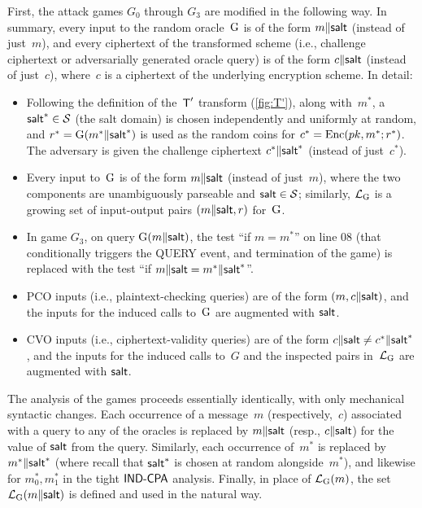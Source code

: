 \documentclass{iacrcc}
\begin{document}
First, the attack games $G_{0}$ through $G_{3}$ are modified in the following way.
In summary, every input to the random oracle~$\textrm{\upshape\mdseries G}$ is of the form $m \| {\mathsf{salt}}$ (instead of just~$m$), and every ciphertext of the transformed scheme (i.e., challenge ciphertext or adversarially generated oracle query) is of the form $c \| {\mathsf{salt}}$ (instead of just~$c$), where~$c$ is a ciphertext of the underlying encryption scheme.
In detail:
\begin{itemize}
\item Following the definition of the~$\textsf{\upshape\mdseries T}'$ transform (\autoref{fig:T'}), along with~$m^{*}$, a ${\mathsf{salt}}^{*} \in \mathcal{S}$ (the salt domain) is chosen independently and uniformly at random, and $r^{*} = \textrm{\upshape\mdseries G}(m^{*} \| {\mathsf{salt}}^{*})$ is used as the random coins for $c^{*} = \textrm{\upshape\mdseries Enc}(pk, m^{*}; r^{*})$.
  The adversary is given the challenge ciphertext $c^{*} \| {\mathsf{salt}}^{*}$ (instead of just~$c^{*}$).

\item Every input to~$\textrm{\upshape\mdseries G}$ is of the form $m \| {\mathsf{salt}}$ (instead of just~$m$), where the two components are unambiguously parseable and ${\mathsf{salt}} \in \mathcal{S}$; similarly, $\mathcal{L}_{\textrm{\upshape\mdseries G}}$ is a growing set of input-output pairs $(m \| {\mathsf{salt}}, r)$ for~$\textrm{\upshape\mdseries G}$.

\item In game $G_{3}$, on query $\textrm{\upshape\mdseries G}(m \| {\mathsf{salt}})$, the test ``if $m=m^{*}$'' on line 08 (that conditionally triggers the QUERY event, and termination of the game) is replaced with the test ``if $m \| {\mathsf{salt}} = m^{*} \| {\mathsf{salt}}^{*}$''.

\item PCO inputs (i.e., plaintext-checking queries) are of the form $(m, c \| {\mathsf{salt}})$, and the inputs for the induced calls to~$\textrm{\upshape\mdseries G}$ are augmented with ${\mathsf{salt}}$.

\item CVO inputs (i.e., ciphertext-validity queries) are of the form $c \| {\mathsf{salt}} \neq c^{*} \| {\mathsf{salt}}^{*}$, and the inputs for the induced calls to~$G$ and the inspected pairs in~$\mathcal{L}_{\textrm{\upshape\mdseries G}}$ are augmented with ${\mathsf{salt}}$.
\end{itemize}

The analysis of the games proceeds essentially identically, with only mechanical syntactic changes.
Each occurrence of a message~$m$ (respectively,~$c$) associated with a query to any of the oracles is replaced by $m \| {\mathsf{salt}}$ (resp., $c \| {\mathsf{salt}}$) for the value of ${\mathsf{salt}}$ from the query.
Similarly, each occurrence of~$m^{*}$ is replaced by $m^{*} \| {\mathsf{salt}}^{*}$ (where recall that ${\mathsf{salt}}^{*}$ is chosen at random alongside~$m^{*}$), and likewise for $m^{*}_{0}, m^{*}_{1}$ in the tight $\textsf{\upshape\mdseries IND-CPA}$ analysis.
Finally, in place of $\mathcal{L}_{\textrm{\upshape\mdseries G}}(m)$, the set $\mathcal{L}_{\textrm{\upshape\mdseries G}}(m \| {\mathsf{salt}})$ is defined and used in the natural way.
\end{document}
